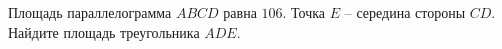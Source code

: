 \begin{ex}
	\begin{condition}
		Площадь параллелограмма \( ABCD \) равна \( 106 \). Точка \( E \) – середина стороны \( CD \). Найдите площадь треугольника \( ADE \).
	\end{condition}
\end{ex}